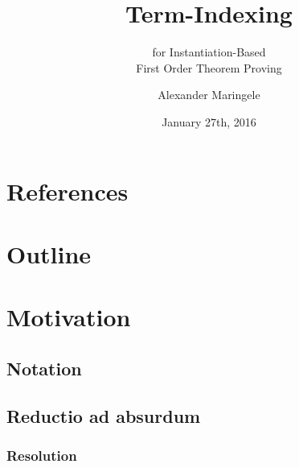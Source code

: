 \documentclass[ 
xcolor={usenames,dvipsnames,svgnames,tablem} 
,handout
]{beamer}
\author{Alexander Maringele}
\title{Term-Indexing
}
\subtitle{for Instantiation-Based\\First Order Theorem Proving}
\date{January 27th, 2016}
\begin{document}


\frame[<+->]{
\maketitle
}

\section*{References}


\section*{Outline}
\setcounter{tocdepth}{1}




%

\section{Motivation}

\subsection{Notation}
\begin{frame}

\end{frame}

\subsection{Reductio ad absurdum}
%
%

\begin{frame}
\frametitle{Resolution}

\end{frame}
\end{document}

